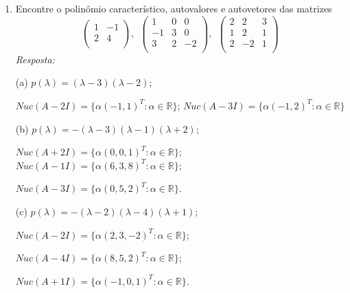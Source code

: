 \documentclass[10pt]{article}
\theoremstyle{plain}
\theoremstyle{obs}
\numberwithin{equation}{section}
\begin{document}
\begin{enumerate}
   \item Encontre o polinômio característico, autovalores e autovetores das matrizes
   $$
\begin{pmatrix}
1 & -1 \\
2 & 4 \\
\end{pmatrix}, \ \ 
\begin{pmatrix}
1 & 0 & 0 \\
-1 & 3 & 0 \\
3 & 2 & -2 \\
\end{pmatrix}, \ \
\begin{pmatrix}
2 & 2 & 3 \\%
1 & 2 & 1 \\
2 & -2 & 1 \\
\end{pmatrix} 
$$ 
 {\it Resposta: }
 
 (a) $p(\lambda)=(\lambda-3)(\lambda-2)$;
 
 $Nuc(A-2I)=\{\alpha(-1,1)^{T}: \alpha \in \mathbb{R}\}$; 
 $Nuc(A-3I)=\{\alpha(-1,2)^{T}: \alpha \in \mathbb{R}\}$
 
 (b) $p(\lambda)=-(\lambda-3)(\lambda-1)(\lambda+2)$;
 
 $Nuc(A+2I)=\{\alpha(0,0,1)^{T}: \alpha \in \mathbb{R}\}$; 
 $Nuc(A-1I)=\{\alpha(6,3,8)^{T}: \alpha \in \mathbb{R}\}$;
 
 $Nuc(A-3I)=\{\alpha(0,5,2)^{T}: \alpha \in \mathbb{R}\}$.
 
 (c) $p(\lambda)=-(\lambda-2)(\lambda-4)(\lambda+1)$;
 
 $Nuc(A-2I)=\{\alpha(2,3,-2)^{T}: \alpha \in \mathbb{R}\}$; 
 
 $Nuc(A-4I)=\{\alpha(8,5,2)^{T}: \alpha \in \mathbb{R}\}$;
 
 $Nuc(A+1I)=\{\alpha(-1,0,1)^{T}: \alpha \in \mathbb{R}\}$.
  

\end{enumerate}
\end{document}

